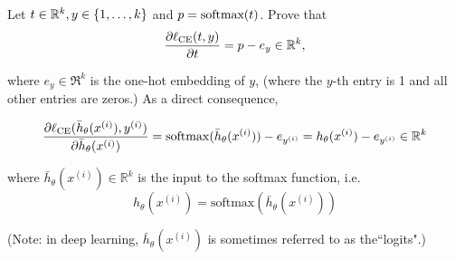 \item {} 





Let $t\in \R^k, y\in \{1,\dots, k\}$ and $p = \softmax(t)$. 
Prove that 
\begin{align}
\frac{\partial \ell_\textup{CE}(t, y)}{\partial t} = p - e_y \in \Re^k,
\end{align}

where $e_y\in \Re^k$ is the one-hot embedding of $y$, (where the $y$-th entry is 1 and all other entries are zeros.)
As a direct consequence, 

\begin{align}
\frac{\partial \ell_\textup{CE}(\bar{h}_{\theta}(x^{(i)}), y^{(i)})}{\partial \bar{h}_{\theta}(x^{(i)})} = \mathrm{softmax}(\bar{h}_{\theta}(x^{(i)})) - e_{y^{(i)}}  = {h}_{\theta}(x^{(i)})- e_{y^{(i)}}\in \Re^k
\end{align}








where $\bar{h}_{\theta}(x^{(i)}) \in \mathbb{R}^k$ is the input to the softmax function, i.e. $${h}_{\theta}(x^{(i)}) = \mathrm{softmax}(\bar{h}_{\theta}(x^{(i)}))$$

(Note: in deep learning, $\bar{h}_{\theta}(x^{(i)})$ is sometimes referred to as the``logits".)

